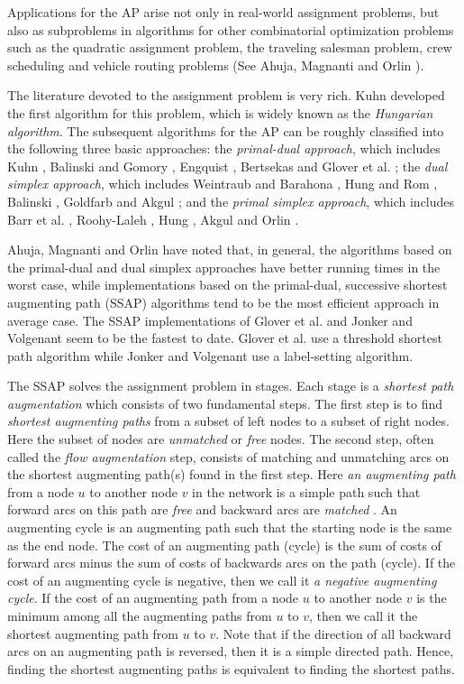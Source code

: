 Applications for the AP arise not only in real-world assignment problems,
but also as subproblems in algorithms for other combinatorial optimization
problems such as the quadratic assignment problem, the traveling salesman
problem, crew scheduling and vehicle routing problems (See Ahuja, Magnanti 
and Orlin \cite{orl1}). 

The literature devoted to the assignment problem
is very rich. Kuhn \cite{kuh1}
developed the first algorithm for this problem, which is widely
known as the {\it Hungarian algorithm}. The subsequent algorithms for the
AP can be roughly classified into the following three basic
approaches: the {\it primal-dual approach}, which includes Kuhn \cite{kuh1},
Balinski and Gomory \cite{bal1}, Engquist \cite{eng1}, 
Bertsekas \cite{ber1} and Glover et al. \cite{glo1};
the {\it dual simplex approach}, which includes Weintraub and Barahona
\cite{wei1}, Hung and Rom \cite{hun2}, Balinski \cite{bal2},
Goldfarb \cite{gol1} and Akgul \cite{akg2};
and the {\it primal simplex approach}, which includes Barr et al. \cite{bar1},
Roohy-Laleh \cite{roo1}, Hung \cite{hun1}, Akgul \cite{akg1} and
Orlin \cite{orl2}.

Ahuja, Magnanti and Orlin \cite{orl1} have noted that, in general,
the algorithms based on the primal-dual and dual simplex approaches have
better running times in the worst case, while implementations
based on the primal-dual, successive shortest augmenting path (SSAP)
algorithms tend to be the most efficient approach  in average case. The SSAP
implementations of Glover et al. \cite{glo1} and 
Jonker and Volgenant \cite{jon1}
seem to be the fastest to date. Glover et al.
use a threshold shortest
path algorithm while Jonker and Volgenant
use a label-setting algorithm.

The SSAP solves the assignment problem in stages. Each stage is
a {\it shortest path augmentation} which consists
of two fundamental steps. The first step is to find
{\it shortest augmenting paths} from a subset of left nodes to a
subset of right nodes. Here the subset of nodes are {\it unmatched}
or {\it free} nodes. The second step, often called the
{\it flow augmentation} step, consists of matching and unmatching arcs
on the shortest augmenting path(s) found in the first step. 
Here {\it an augmenting path}
from a node $u$ to another node $v$ in the network
is a simple path such that forward arcs
on this path are {\it free} and backward arcs are {\it matched }. 
An augmenting cycle is an augmenting
path such that the starting node is the same as the end node. The cost
of an augmenting path (cycle) is the sum of costs of forward arcs minus the
sum of costs of backwards arcs on the path (cycle). If the cost
of an augmenting cycle is negative, then we call it {\it a negative
augmenting cycle}. If the cost of an augmenting path from a node
$u$ to another node $v$ is the minimum among all the augmenting paths from
$u$ to $v$, then we call it the shortest augmenting path from $u$ to $v$.
Note that if the direction of all backward arcs on an augmenting path 
is reversed, then it is a simple directed path.  Hence, finding the 
shortest augmenting paths is equivalent to finding the shortest paths.


